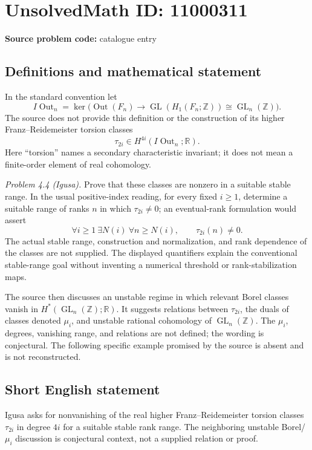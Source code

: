 \documentclass[11pt]{article}
\newcommand{\Z}{\mathbb{Z}}
\newcommand{\R}{\mathbb{R}}
\begin{document}
\section*{UnsolvedMath ID: 11000311}
\textbf{Source problem code:} catalogue entry
\subsection{Definitions and mathematical statement}
In the standard convention let
\[
 I\operatorname{Out}_n=
 \ker\bigl(\operatorname{Out}(F_n)\to\operatorname{GL}(H_1(F_n;\Z))
 \cong\operatorname{GL}_n(\Z)\bigr).
\]
The source does not provide this definition or the construction of its higher Franz--Reidemeister torsion classes
\[
 \tau_{2i}\in H^{4i}(I\operatorname{Out}_n;\R).
\]
Here ``torsion'' names a secondary characteristic invariant; it does not mean a finite-order element of real cohomology.

\emph{Problem 4.4 (Igusa).} Prove that these classes are nonzero in a suitable stable range. In the usual positive-index reading, for every fixed \(i\geq1\), determine a suitable range of ranks \(n\) in which \(\tau_{2i}\neq0\); an eventual-rank formulation would assert
\[
 \forall i\geq1\ \exists N(i)\ \forall n\geq N(i),
 \qquad \tau_{2i}(n)\neq0.
\]
The actual stable range, construction and normalization, and rank dependence of the classes are not supplied. The displayed quantifiers explain the conventional stable-range goal without inventing a numerical threshold or rank-stabilization maps.

The source then discusses an unstable regime in which relevant Borel classes vanish in \(H^*(\operatorname{GL}_n(\Z);\R)\). It suggests relations between \(\tau_{2i}\), the duals of classes denoted \(\mu_i\), and unstable rational cohomology of \(\operatorname{GL}_n(\Z)\). The \(\mu_i\), degrees, vanishing range, and relations are not defined; the wording is conjectural. The following specific example promised by the source is absent and is not reconstructed.
\subsection{Short English statement}
Igusa asks for nonvanishing of the real higher Franz--Reidemeister torsion classes \(\tau_{2i}\) in degree \(4i\) for a suitable stable rank range. The neighboring unstable Borel/\(\mu_i\) discussion is conjectural context, not a supplied relation or proof.
\end{document}

